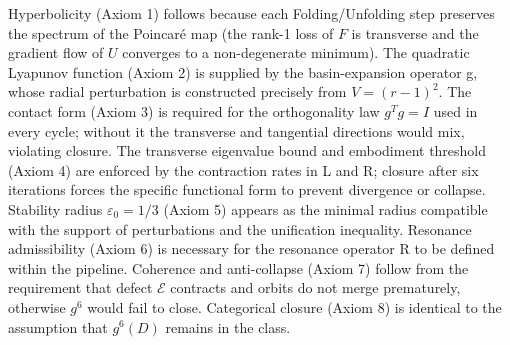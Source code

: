 Hyperbolicity (Axiom 1) follows because each Folding/Unfolding step preserves the spectrum of the Poincaré map (the rank-1 loss of $  F  $ is transverse and the gradient flow of $  U  $ converges to a non-degenerate minimum).
The quadratic Lyapunov function (Axiom 2) is supplied by the basin-expansion operator g, whose radial perturbation is constructed precisely from $  V = (r-1)^2  $.
The contact form (Axiom 3) is required for the orthogonality law $  g^T g = I  $ used in every cycle; without it the transverse and tangential directions would mix, violating closure.
The transverse eigenvalue bound and embodiment threshold (Axiom 4) are enforced by the contraction rates in L and R; closure after six iterations forces the specific functional form to prevent divergence or collapse.
Stability radius $  \varepsilon_0 = 1/3  $ (Axiom 5) appears as the minimal radius compatible with the support of perturbations and the unification inequality.
Resonance admissibility (Axiom 6) is necessary for the resonance operator R to be defined within the pipeline.
Coherence and anti-collapse (Axiom 7) follow from the requirement that defect $  \mathcal{E}  $ contracts and orbits do not merge prematurely, otherwise $  g^6  $ would fail to close.
Categorical closure (Axiom 8) is identical to the assumption that $  g^6(D)  $ remains in the class.


